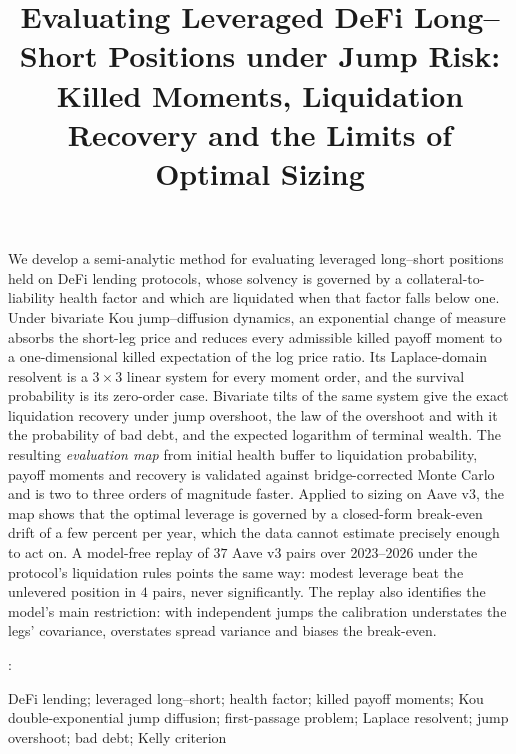 \documentclass[11pt]{article}
\makeatletter
\renewcommand{\maketitle}{%
  \clearpage\null
  \vspace*{42pt}%
  \begin{center}
    {\fontsize{18}{22}\selectfont\bfseries\MakeUppercase{\@title}\par}%
    \ifx\@author\@empty\else
      \vskip 21pt
      {\fontsize{13}{15}\selectfont\@author\par}%
    \fi
  \end{center}
  \vskip 18pt
}
\renewenvironment{abstract}{%
  \fontsize{9}{11}\selectfont
  \setlength{\leftskip}{2pc}%
  \setlength{\rightskip}{2pc}%
  \noindent\ignorespaces
}{%
  \par\addvspace{32pt}%
}
\newenvironment{keywords}{%
  \par\addvspace{11pt}%
  \fontsize{9}{11}\selectfont
  \setlength{\leftskip}{2pc}%
  \setlength{\rightskip}{2pc plus 1fill}%
  \noindent{\itshape Keywords\/}: \ignorespaces
}{%
  \par\addvspace{26pt plus 4pt}%
}
\theoremstyle{plain}
\theoremstyle{definition}
\theoremstyle{remark}
\makeatother
\begin{document}
\title{Evaluating Leveraged DeFi Long--Short Positions under Jump Risk: Killed Moments, Liquidation Recovery and the Limits of Optimal Sizing}


\maketitle

\begin{abstract}
We develop a semi-analytic method for evaluating leveraged long--short positions held on DeFi
lending protocols, whose solvency is governed by a collateral-to-liability health factor and which
are liquidated when that factor falls below one. Under bivariate Kou jump--diffusion dynamics, an
exponential change of measure absorbs the short-leg price and reduces every admissible killed
payoff moment to a one-dimensional killed expectation of the log price ratio. Its Laplace-domain
resolvent is a $3\times3$ linear system for every moment order, and the survival probability is its
zero-order case. Bivariate tilts of the same system give the exact liquidation recovery under jump
overshoot, the law of the overshoot and with it the probability of bad debt, and the expected
logarithm of terminal wealth. The resulting \emph{evaluation map} from initial health buffer to
liquidation probability, payoff moments and recovery is validated against bridge-corrected Monte
Carlo and is two to three orders of magnitude faster. Applied to sizing on Aave v3, the map shows
that the optimal leverage is governed by a closed-form break-even drift of a few percent per year,
which the data cannot estimate precisely enough to act on. A model-free replay of $37$ Aave v3 pairs
over 2023--2026 under the protocol's liquidation rules points the same way: modest leverage beat
the unlevered position in $4$ pairs, never significantly. The replay also identifies the model's main
restriction: with independent jumps the calibration understates the legs' covariance, overstates
spread variance and biases the break-even.
\end{abstract}

\begin{keywords}
DeFi lending; leveraged long--short; health factor; killed payoff moments; Kou double-exponential jump diffusion; first-passage problem; Laplace resolvent; jump overshoot; bad debt; Kelly criterion
\end{keywords}
\end{document}
